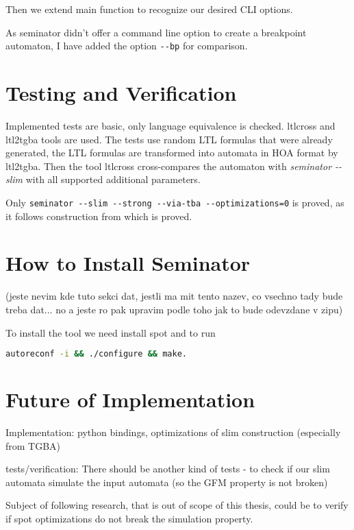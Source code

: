 \documentclass[
	digital
nolof, nolot
]{fithesis3}
\begin{document}
	Then we extend main function to recognize our desired CLI options.
	
	As seminator didn't offer a command line option to create a breakpoint automaton, I have added the option \texttt{-{}-bp} for comparison.
	
	
	
	\section{Testing and Verification}
	Implemented tests are basic, only language equivalence is checked.
	ltlcross and ltl2tgba tools are used. The tests use random LTL formulas that were already generated, the LTL formulas are transformed into automata in HOA format by ltl2tgba.
	Then the tool ltlcross cross-compares the automaton with \emph{seminator -{}-slim} with all supported additional parameters.
	
	Only \texttt{seminator -{}-slim -{}-strong -{}-via-tba -{}-optimizations=0} is proved, as it follows construction from \cite{hlavni} which is proved.
	
	
	\section{How to Install Seminator}
	(jeste nevim kde tuto sekci dat, jestli ma mit tento nazev, co vsechno tady bude treba dat... no a jeste ro pak upravim podle toho jak to bude odevzdane v zipu)
	
	To install the tool we need install spot and to run 
	
	\begin{lstlisting}[language=bash]
autoreconf -i && ./configure && make.
	\end{lstlisting}
	\section{Future of Implementation}
	Implementation:
	python bindings, optimizations of slim construction (especially from TGBA)
	
	
	
	tests/verification:
	There should be another kind of tests - to check if our slim automata simulate the input automata (so the GFM property is not broken)
	
	Subject of following research, that is out of scope of this thesis, could be to verify if spot optimizations do not break the simulation property. 
	
\end{document}
